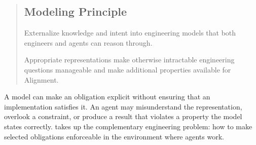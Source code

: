 


\begin{quote}
\mbox{}%
\subsection{Modeling Principle}\label{heading:modeling-principle}

Externalize knowledge and intent into engineering models that both engineers and agents can reason through.

Appropriate representations make otherwise intractable engineering questions manageable and make additional properties available for Alignment.
\end{quote}

A model can make an obligation explicit without ensuring that an implementation satisfies it. An agent may misunderstand the representation, overlook a constraint, or produce a result that violates a property the model states correctly.  takes up the complementary engineering problem: how to make selected obligations enforceable in the environment where agents work.
